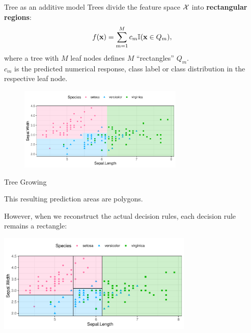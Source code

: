 \documentclass[11pt,compress,t,notes=noshow, xcolor=table]{beamer}
\begin{document}
\begin{vbframe}{Tree as an additive model}
Trees divide the feature space $\mathcal{X}$ into \textbf{rectangular regions}: 
  \begin{align*}
    f(\mathbf{x}) = \sum_{m=1}^M c_m \mathbb{I}(\mathbf{x} \in Q_m),
  \end{align*}
  where a tree with $M$ leaf nodes defines $M$ \enquote{rectangles} $Q_m$.\\
  $c_m$ is the predicted numerical response, class label or class
  distribution in the respective leaf node.
  \begin{figure}
\includegraphics[width=0.7\textwidth, keepaspectratio]{figure/cart_intro_classification_tree_wide.pdf}
\end{figure}

\end{vbframe}

\begin{vbframe}{Tree Growing}

This resulting prediction areas are polygons.

However, when we reconstruct the actual decision rules, each decision rule remains a rectangle:

\color{fgcolor}

{\centering \includegraphics[width=0.7\textwidth]{figure/tree-depth3-area-withblacklines.pdf} 

}

\end{vbframe}
\end{document}
